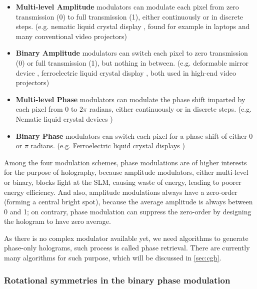 \begin{itemize}
  \item \textbf{Multi-level Amplitude} modulators can modulate each pixel from zero transmission (0) to full transmission (1), either continuously or in discrete steps. (e.g. nematic liquid crystal display \cite{Schadt1971}, found for example in laptops and many conventional video projectors)
  \item \textbf{Binary Amplitude} modulators can switch each pixel to zero transmission (0) or full transmission (1), but nothing in between. (e.g. deformable mirror device \cite{Pape1983}, ferroelectric liquid crystal display \cite{Johnson1993}, both used in high-end video projectors)
  \item \textbf{Multi-level Phase} modulators can modulate the phase shift imparted by each pixel from 0 to 2$\pi$ radians, either continuously or in discrete steps. (e.g. Nematic liquid crystal devices \cite{Lee2004})
  \item \textbf{Binary Phase} modulators can switch each pixel for a phase shift of either 0 or $\pi$ radians. (e.g. Ferroelectric liquid crystal displays \cite{Broomfield1992})
\end{itemize}

Among the four modulation schemes, phase modulations are of higher interests for the purpose of holography, because amplitude modulators, either multi-level or binary, blocks light at the SLM, causing waste of energy, leading to poorer energy efficiency. And also, amplitude modulations always have a zero-order (forming a central bright spot), because the average amplitude is always between 0 and 1; on contrary, phase modulation can suppress the zero-order by designing the hologram to have zero average.

As there is no complex modulator available yet, we need algorithms to generate phase-only holograms, such process is called phase retrieval. There are currently many algorithms for such purpose, which will be discussed in \cref{sec:cgh}.

\subsubsection{Rotational symmetries in the binary phase modulation} \label{sec:Rotational symmetries in the binary phase modulation}

